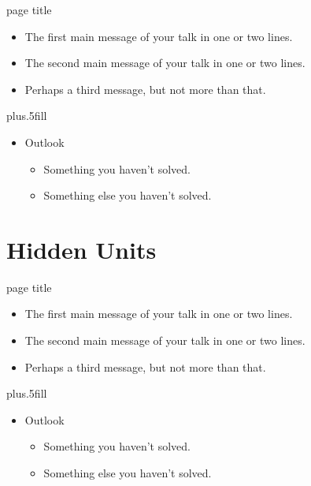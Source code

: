 \documentclass{beamer}
\begin{document}
\begin{frame}{page title}
	
	\begin{itemize}
		\item
		The \alert{first main message} of your talk in one or two lines.
		\item
		The \alert{second main message} of your talk in one or two lines.
		\item
		Perhaps a \alert{third message}, but not more than that.
	\end{itemize}
	
	\vskip0pt plus.5fill
	\begin{itemize}
		\item
		Outlook
		\begin{itemize}
			\item
			Something you haven't solved.
			\item
			Something else you haven't solved.
		\end{itemize}
	\end{itemize}
\end{frame}

\section{Hidden Units}

\begin{frame}{page title}

  \begin{itemize}
  \item
    The \alert{first main message} of your talk in one or two lines.
  \item
    The \alert{second main message} of your talk in one or two lines.
  \item
    Perhaps a \alert{third message}, but not more than that.
  \end{itemize}
  
  \vskip0pt plus.5fill
  \begin{itemize}
  \item
    Outlook
    \begin{itemize}
    \item
      Something you haven't solved.
    \item
      Something else you haven't solved.
    \end{itemize}
  \end{itemize}
\end{frame}
\end{document}
